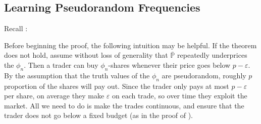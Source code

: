 \documentclass[authordate,onecolumn,noenvironments]{miri-tech-article}
\numberwithin{equation}{subsection}
\newcommand{\seq}[1]{{\overline{#1}}}
\newcommand{\nn}{n}
\newcommand{\fuz}{w}
\newcommand{\phis}{\seq{\phi}}
\newcommand{\ec}[1][\ ]{e.c.#1}
\newcommand{\BelState}{\mathbb{P}}
\newcommand{\pt}{\BelState}
\newcommand{\MP}{\seq{\pt}}
\newcommand{\Theory}{\Gamma}
\newcommand{\thmind}[1][\Theory]{\operatorname{Thm}_{#1}\-} %
\begin{document}

\subsection{Learning Pseudorandom Frequencies}\label{sec:prand}
Recall :

\benford*

\noindent Before beginning the proof, the following intuition may be helpful. If the theorem does not hold, assume without loss of generality that $\MP$ repeatedly underprices the $\phi_\nn$. Then a trader can buy $\phi_\nn$-shares whenever their price goes below $p-\varepsilon$. By the assumption that the truth values of the $\phi_\nn$ are pseudorandom, roughly $p$ proportion of the shares will pay out. Since the trader only pays at most $p-\varepsilon$ per share, on average they make $\varepsilon$ on each trade, so over time they exploit the market. All we need to do is make the trades continuous, and ensure that the trader does not go below a fixed budget (as in the proof of ).
\end{document}
